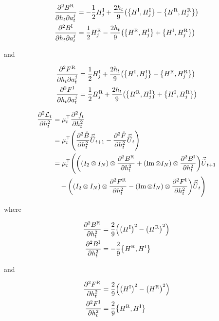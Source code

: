 \documentclass{article}
\newcommand{\isovecU}{\vec{\widetilde{U}}}
\newcommand{\HI}{H^{\text{I}}}
\newcommand{\HR}{H^{\text{R}}}
\newcommand{\BR}{B^{\text{R}}}
\newcommand{\BI}{B^{\text{I}}}
\newcommand{\FR}{F^{\text{R}}}
\newcommand{\FI}{F^{\text{I}}}
\begin{document}
\begin{align*}
  \pdv{\BR}{h_t}{a^j_t} &= -\frac{1}{2}\HI_j + \frac{2h_t}{9}\qty(\qty{\HI, \HI_j} - \qty{\HR, \HR_j})\\
  \pdv{\BI}{h_t}{a^j_t} &= \frac{1}{2}\HR_j - \frac{2h_t}{9}\qty(\qty{\HR, \HI_j} + \qty{\HI, \HR_j})\\
\end{align*}

and

\begin{align*}
  \pdv{\FR}{h_t}{a^j_t} &= \frac{1}{2}\HI_j + \frac{2h_t}{9}\qty(\qty{\HI, \HI_j} - \qty{\HR, \HR_j})\\
  \pdv{\FI}{h_t}{a^j_t} &= \frac{1}{2}\HR_j + \frac{2h_t}{9}\qty(\qty{\HR, \HI_j} + \qty{\HI, \HR_j})\\
\end{align*}

\begin{align*}
  \pdv[2]{\mathcal{L}_t}{h_t} &= \mu_t^\top \pdv[2]{f_t}{h_t} \\
  &= \mu_t^\top \qty(\pdv[2]{\hat B}{h_t} \isovecU_{t+1} - \pdv[2]{\hat F}{h_t} \isovecU_t) \\
  &= \mu_t^\top \Bigg( \qty(\qty(I_2 \otimes I_N) \otimes \pdv[2]{\BR}{h_t} + (\Im \otimes I_N) \otimes \pdv[2]{\BI}{h_t}) \isovecU_{t+1} \\
  & \quad - \qty(\qty(I_2 \otimes I_N) \otimes \pdv[2]{\FR}{h_t} - \qty(\Im \otimes I_N) \otimes \pdv[2]{\FI}{h_t}) \isovecU_t \Bigg) \\
\end{align*}

where

\begin{align*}
  \pdv[2]{\BR}{h_t} &= \frac{2}{9}\qty(\qty(\HI)^2 - \qty(\HR)^2)\\
  \pdv[2]{\BI}{h_t} &= -\frac{2}{9}\qty{\HR, \HI}\\
\end{align*}

and 

\begin{align*}
  \pdv[2]{\FR}{h_t} &= \frac{2}{9}\qty(\qty(\HI)^2 - \qty(\HR)^2)\\
  \pdv[2]{\FI}{h_t} &= \frac{2}{9}\qty{\HR, \HI}\\
\end{align*}
\end{document}
